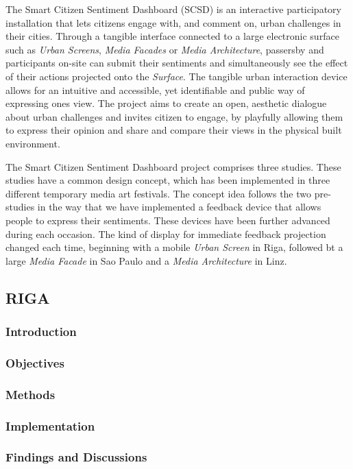 The Smart Citizen Sentiment Dashboard (SCSD) is an interactive participatory installation that lets citizens engage with, and comment on, urban challenges in their cities. 
Through a tangible interface connected to a large electronic surface such as \textit{Urban Screens}, \textit{Media Facades} or \textit{Media Architecture}, passersby and participants on-site can submit their sentiments and simultaneously see the effect of their actions projected onto the \textit{Surface}. 
The tangible urban interaction device allows for an intuitive and accessible, yet identifiable and public way of expressing ones view. 
The project aims to create an open, aesthetic dialogue about urban challenges and invites citizen to engage, by playfully allowing them to express their opinion and share and compare their views in the physical built environment.

The Smart Citizen Sentiment Dashboard project comprises three studies. 
These studies have a common design concept, which has been implemented in three different temporary media art festivals. 
The concept idea follows the two pre-studies in the way that we have implemented a feedback device that allows people to express their sentiments. 
These devices have been further advanced during each occasion. 
The kind of display for immediate feedback projection changed each time, beginning with a mobile \textit{Urban Screen} in Riga, followed bt a large \textit{Media Facade} in Sao Paulo and a \textit{Media Architecture} in Linz.  

\subsection{RIGA}

\subsubsection {Introduction} 
\subsubsection {Objectives} 
\subsubsection {Methods}
\subsubsection {Implementation}
\subsubsection {Findings and Discussions}

